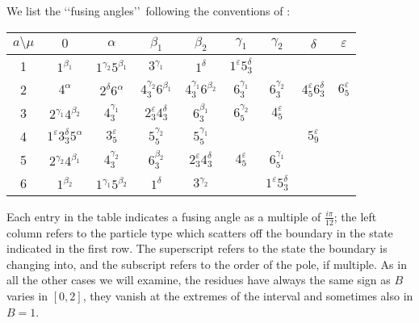 \documentclass[a4paper,12pt]{report}
\begin{document}
\vspace{1cm}

We list the \lq\lq fusing angles\rq\rq \, following the conventions of \cite{fring2}:

\begin{center}
\begin{tabular}{|c|c|c|c|c|c|c|c|c|}\hline
 $ a\setminus\mu$  &  $ 0$  &  $ \alpha$ & $ \beta_{1}$ & $ \beta_{2}$ &  $ \gamma_{1}$ & $\gamma_{2}$ & $\delta$ &$\varepsilon$  \\ \hline
 1 & $1^{\beta_{1}}$ & $1^{\gamma_{2}}5^{\beta_{1}}$& $3^{\gamma_{1}}$& $1^{\delta}$& $1^{\varepsilon}5_{3}^{\delta}$& & &  \\ \hline
 2 & $4^{\alpha}$ & $2^{\delta}6^{\alpha}$ & $4_{3}^{\gamma_{2}}6^{\beta_{1}}$& $4_{3}^{\gamma_{1}}6^{\beta_{2}}$& $6_{3}^{\gamma_{1}}$& $6_{3}^{\gamma_{2}}$& $4_{5}^{\varepsilon}6_{3}^{\delta}$& $6_{5}^{\varepsilon}$\\ \hline
 3 & $2^{\gamma_{1}}4^{\beta_{2}}$ & $4_{3}^{\gamma_{1}}$ & $2_{3}^{\varepsilon}4_{3}^{\delta}$ & $6_{3}^{\beta_{1}}$ & $6_{5}^{\gamma_{2}}$ & $4_{5}^{\varepsilon}$ & & \\ \hline
 4 & $1^{\varepsilon}3_{3}^{\delta}5^{\alpha}$& $3_{5}^{\varepsilon}$ & $5_{5}^{\gamma_{2}}$ & $5_{5}^{\gamma_{1}}$& & & $5_{9}^{\varepsilon}$& \\ \hline
 5 & $2^{\gamma_{2}}4^{\beta_{1}}$ & $4_{3}^{\gamma_{2}}$ & $6_{3}^{\beta_{2}}$ & $2_{3}^{\varepsilon}4_{3}^{\delta}$   & $4_{5}^{\varepsilon}$ & $6_{5}^{\gamma_{1}}$& & \\ \hline
 6 & $1^{\beta_{2}}$ & $1^{\gamma_{1}}5^{\beta_{2}}$& $1^{\delta}$& $3^{\gamma_{2}}$& & $1^{\varepsilon}5_{3}^{\delta}$& &   \\ \hline
\end{tabular}
\end{center}

\vspace{0.5cm}

Each entry in the table indicates a fusing angle as a multiple of $\frac{i\pi}{12}$; the left column refers to the
particle type which scatters off the boundary in the state indicated in the first row. The superscript refers to
the state the boundary is changing into, and the subscript refers to the order of the pole, if multiple. As in
all the other cases we will examine, the residues have always the same sign as $B$ varies in $[0,2]$, they vanish
at the extremes of the interval and sometimes also in $B=1$.

\vspace{0.5cm}
\end{document}
